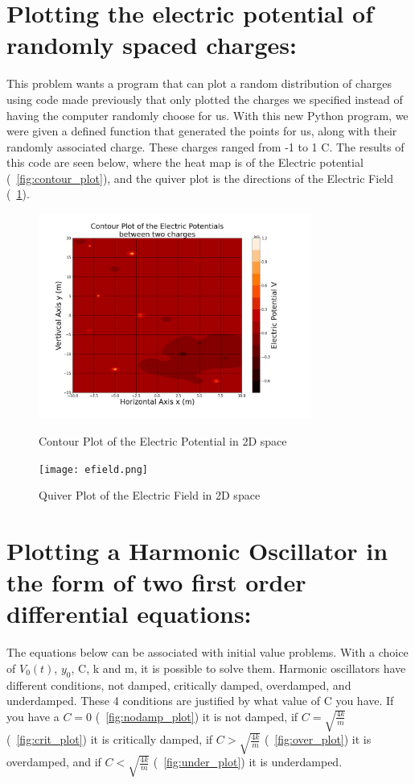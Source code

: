 \documentclass{article}
\begin{document}
\section{Plotting the electric potential of randomly spaced charges:}
\label{intro}
This problem wants a program that can plot a random distribution of charges using code made previously that only plotted the charges we specified instead of having the computer randomly choose for us. With this new Python program, we were given a defined function that generated the points for us, along with their randomly associated charge. These charges ranged from -1 to 1 C. The results of this code are seen below, where the heat map is of the Electric potential (\figurename~\ref{fig:contour_plot}), and the quiver plot is the directions of the Electric Field (\figurename~\ref{fig:quiver_plot}). 

\begin{figure}[h]
    \centering
    \includegraphics[width=0.8\textwidth]{potential.png}  %
    \caption{Contour Plot of the Electric Potential in 2D space}
    \label{fig:contour_plot}
    \centering
    \texttt{[image: efield.png]}  %
    \caption{Quiver Plot of the Electric Field in 2D space}
    \label{fig:quiver_plot}
\end{figure}

\section{Plotting a Harmonic Oscillator in the form of two first order differential equations:}
\label{intro}
The equations below can be associated with initial value problems. With a choice of $V_0(t)$, $y_0$, C, k and m, it is possible to solve them. Harmonic oscillators have different conditions, not damped, critically damped, overdamped, and underdamped. These 4 conditions are justified by what value of C you have. If you have a $C = 0$ (\figurename~\ref{fig:nodamp_plot}) it is not damped, if $C = \sqrt{\frac{4k}{m}}$ (\figurename~\ref{fig:crit_plot}) it is critically damped, if $C > \sqrt{\frac{4k}{m}}$ (\figurename~\ref{fig:over_plot}) it is overdamped, and if $C < \sqrt{\frac{4k}{m}}$ (\figurename~\ref{fig:under_plot}) it is underdamped.
\end{document}
